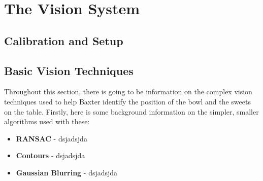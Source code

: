 \section{The Vision System}
\subsection{Calibration and Setup}
\subsection{Basic Vision Techniques}
Throughout this section, there is going to be information on the complex vision techniques used to help Baxter identify the position of the bowl and the sweets on the table. Firstly, here is some background information on the simpler, smaller algorithms used with these:
\begin{itemize}
\item{\textbf{RANSAC} - dsjadsjda}
\item{\textbf{Contours} - dsjadsjda}
\item{\textbf{Gaussian Blurring} - dsjadsjda}
\end{itemize}

